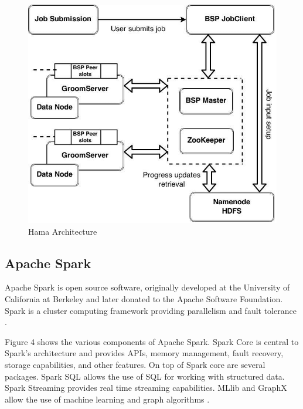 \documentclass[9pt,twocolumn,twoside]{../../styles/osajnl}
\begin{document}
\begin{figure}[ht]
  \includegraphics[scale=0.35]{images/hama-architecture.jpg}
  \caption{Hama Architecture \cite{apachehama}}
\end{figure}







\subsection{Apache Spark}

Apache Spark is open source software, originally developed at the University of California at Berkeley and later donated to the Apache Software Foundation. Spark is a cluster computing framework providing parallelism and fault tolerance \cite{www-wikispark}.

Figure 4 shows the various components of Apache Spark.  Spark Core is central to Spark's architecture and provides APIs, memory management, fault recovery, storage capabilities, and other features. On top of Spark core are several packages.  Spark SQL allows the use of SQL for working with structured data.  Spark Streaming provides real time streaming capabilities.  MLlib and GraphX allow the use of machine learning and graph algorithms \cite{www-techstory}.
\end{document}
